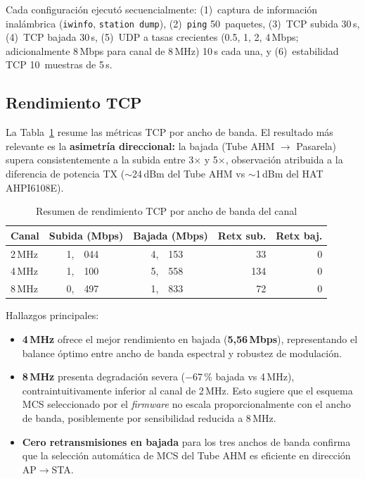 Cada configuración ejecutó secuencialmente: (1)~captura de información inalámbrica (\texttt{iwinfo}, \texttt{station dump}), (2)~\texttt{ping} 50~paquetes, (3)~TCP subida 30\,s, (4)~TCP bajada 30\,s, (5)~UDP a tasas crecientes (0.5, 1, 2, 4\,Mbps; adicionalmente 8\,Mbps para canal de 8\,MHz) 10\,s cada una, y (6)~estabilidad TCP 10~muestras de 5\,s.


\subsection{Rendimiento TCP}
\label{sec:resultados-halow-tcp}



La Tabla~\ref{tab:halow-tcp-summary} resume las métricas TCP por ancho de banda. El resultado más relevante es la \textbf{asimetría direccional:} la bajada (Tube AHM $\rightarrow$ Pasarela) supera consistentemente a la subida entre 3$\times$ y 5$\times$, observación atribuida a la diferencia de potencia TX ($\sim$24\,dBm del Tube AHM vs $\sim$1\,dBm del HAT AHPI6108E).

\begin{table}[H]
\centering
\caption{Resumen de rendimiento TCP por ancho de banda del canal}
\label{tab:halow-tcp-summary}
\small
\begin{tabular}{l r@{\,}l r@{\,}l r r}
\toprule
\textbf{Canal} & \multicolumn{2}{c}{\textbf{Subida (Mbps)}} & \multicolumn{2}{c}{\textbf{Bajada (Mbps)}} & \textbf{Retx sub.} & \textbf{Retx baj.} \\
\midrule
2\,MHz  & 1,&044 & 4,&153 & 33 & 0 \\
4\,MHz  & 1,&100 & 5,&558 & 134 & 0 \\
8\,MHz  & 0,&497 & 1,&833 & 72 & 0 \\
\bottomrule
\end{tabular}
\end{table}

Hallazgos principales:
\begin{itemize}
    \item \textbf{4\,MHz} ofrece el mejor rendimiento en bajada (\textbf{5,56\,Mbps}), representando el balance óptimo entre ancho de banda espectral y robustez de modulación.
    \item \textbf{8\,MHz} presenta degradación severa ($-$67\,\% bajada vs 4\,MHz), contraintuitivamente inferior al canal de 2\,MHz. Esto sugiere que el esquema MCS seleccionado por el \emph{firmware} no escala proporcionalmente con el ancho de banda, posiblemente por sensibilidad reducida a 8\,MHz.
    \item \textbf{Cero retransmisiones en bajada} para los tres anchos de banda confirma que la selección automática de MCS del Tube AHM es eficiente en dirección AP$\rightarrow$STA.
\end{itemize}


